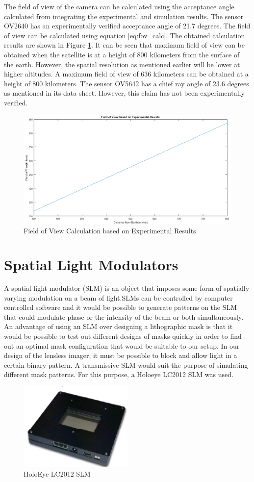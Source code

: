 The field of view of the camera can be calculated using the acceptance angle calculated from integrating the experimental and simulation results. The sensor OV2640 has an experimentally verified acceptance angle of 21.7 degrees. The field of view can be calculated using equation \ref{eq:fov_calc}. The obtained calculation results are shown in Figure \ref{fig:fov-graph-1}. It can be seen that maximum field of view can be obtained when the satellite is at a height of 800 kilometers from the surface of the earth. However, the spatial resolution as mentioned earlier will be lower at higher altitudes. A maximum field of view of 636 kilometers can be obtained at a height of 800 kilometers. The sensor OV5642 has a chief ray angle of 23.6 degrees as mentioned in its data sheet\cite{OV5642DS}. However, this claim has not been experimentally verified.

\begin{figure}[]
\centering
\includegraphics[width = \linewidth]{pics/fov-calc}
\caption{Field of View Calculation based on Experimental Results}
\label{fig:fov-graph-1}
\end{figure}

\section{Spatial Light Modulators}
A spatial light modulator (SLM) is an object that imposes some form of spatially varying modulation on a beam of light\cite{SLMWiki}.SLMs can be controlled by computer controlled software and it would be possible to generate patterns on the SLM that could modulate phase or the intensity of the beam or both simultaneously. An advantage of using an SLM over designing a lithographic mask is that it would be possible to test out different designs of masks quickly in order to find out an optimal mask configuration that would be suitable to our setup. In our design of the lensless imager, it must be possible to block and allow light in a certain binary pattern. A transmissive SLM would suit the purpose of simulating different mask patterns. For this purpose, a Holoeye LC2012 SLM was used.

\begin{figure}[ht]
\centering
\includegraphics[width=0.5\textwidth]{pics/slm}
\caption{HoloEye LC2012 SLM}
\label{fig:slm}
\end{figure}
